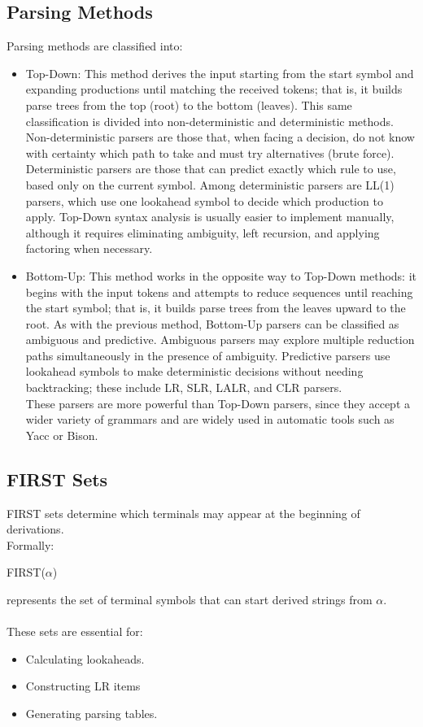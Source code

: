 \documentclass[letterpaper,12pt,oneside]{article}
\begin{document}
    \subsection{Parsing Methods}
    Parsing methods are classified into:
    \begin{itemize}
        \item Top-Down: This method derives the input starting from the start symbol and expanding productions until matching the received tokens; that is, it builds parse trees from the top (root) to the bottom (leaves). This same classification is divided into non-deterministic and deterministic methods. Non-deterministic parsers are those that, when facing a decision, do not know with certainty which path to take and must try alternatives (brute force). Deterministic parsers are those that can predict exactly which rule to use, based only on the current symbol. Among deterministic parsers are LL(1) parsers, which use one lookahead symbol to decide which production to apply. Top-Down syntax analysis is usually easier to implement manually, although it requires eliminating ambiguity, left recursion, and applying factoring when necessary.\cite{aho2008compiladores}
        \item Bottom-Up: This method works in the opposite way to Top-Down methods: it begins with the input tokens and attempts to reduce sequences until reaching the start symbol; that is, it builds parse trees from the leaves upward to the root. As with the previous method, Bottom-Up parsers can be classified as ambiguous and predictive. Ambiguous parsers may explore multiple reduction paths simultaneously in the presence of ambiguity. Predictive parsers use lookahead symbols to make deterministic decisions without needing backtracking; these include LR, SLR, LALR, and CLR parsers.\\
        These parsers are more powerful than Top-Down parsers, since they accept a wider variety of grammars and are widely used in automatic tools such as Yacc or Bison.\cite{aho2008compiladores}
    \end{itemize}

    \subsection{FIRST Sets}
    FIRST sets determine which terminals may appear at the beginning of derivations. \\
    Formally:
    \begin{center}
        FIRST($\alpha$)
    \end{center}
    represents the set of terminal symbols that can start derived strings from $\alpha$. \\ \\
    These sets are essential for:
    \begin{itemize}
        \item Calculating lookaheads.
        \item Constructing LR items
        \item Generating parsing tables.
    \end{itemize}
\end{document}
